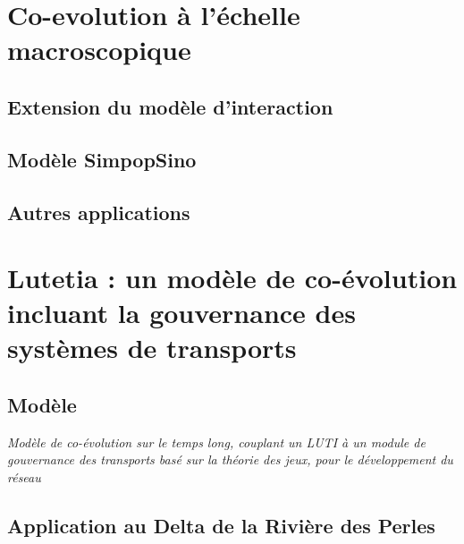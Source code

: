 

\section{Co-evolution à l'échelle macroscopique}

\subsection{Extension du modèle d'interaction}


\subsection{Modèle SimpopSino}



\subsection{Autres applications}



\section{Lutetia : un modèle de co-évolution incluant la gouvernance des systèmes de transports}

\subsection{Modèle}

\textit{Modèle de co-évolution sur le temps long, couplant un LUTI à un module de gouvernance des transports basé sur la théorie des jeux, pour le développement du réseau~\cite{le2015modeling}}

\subsection{Application au Delta de la Rivière des Perles}

